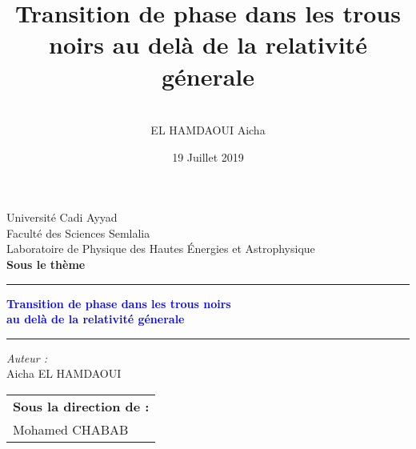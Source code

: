 \documentclass{beamer}
\author{\\EL HAMDAOUI Aicha }
\date{19 Juillet 2019}
\title{Transition de phase dans les trous noirs au delà de la relativité génerale}
\newcommand{\reportauthor}{Aicha \textsc{EL HAMDAOUI}} %
\newcommand{\HRule}{\rule{\linewidth}{0.7mm}}
\begin{document}
\begin{frame}
  \begin{minipage}{0.3\linewidth}
    	\begin{center}
    	\end{center}
   \end{minipage}\hfill
   \begin{minipage}{0.3\linewidth}
  	  	\begin{center}
  	  	\end{center}
  \end{minipage}\hfill  
  \begin{minipage}{0.3\linewidth}
    	  	\begin{center}
    	  	\end{center}
    \end{minipage} 
 	\begin{center}
 	    { Université Cadi Ayyad} \\
 	     Faculté des Sciences Semlalia\\
 	    Laboratoire de Physique des Hautes Énergies et Astrophysique\\
 	    \textbf{Sous le thème}
 	    \end{center}
   
   \HRule
   \begin{center}
     \large  
     	\textcolor{blue}{\textbf{Transition de phase dans les trous noirs }} \\
     	\textcolor{blue}{\textbf{ au delà de la relativité génerale}}
   \end{center}
   \HRule
   \normalsize
   \newline
    \begin{minipage}[b]{0.45\linewidth}
          \begin{flushleft}
          \emph{Auteur :}\\
        \reportauthor
    \end{flushleft}       
       \end{minipage}
        \begin{minipage}[b]{0.45\linewidth}   
          \begin{flushright}
          		\begin{tabular}{l}
          			\textbf{Sous la direction de :} \\
          			       Mohamed \textsc{CHABAB} \\
          			        
          		\end{tabular}
              
    \end{flushright}   
       \end{minipage}
    
\end{frame}
\end{document}

